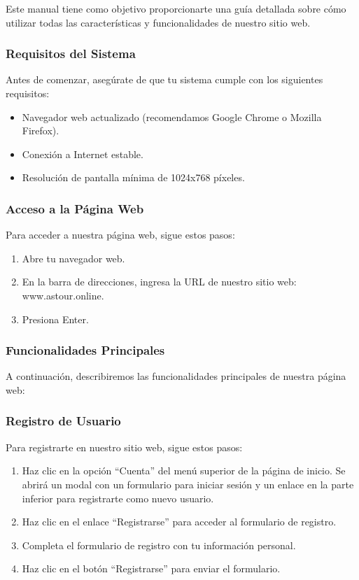 Este manual tiene como objetivo proporcionarte una guía detallada sobre cómo utilizar todas las características y funcionalidades de nuestro sitio web.

\subsubsection{Requisitos del Sistema}
Antes de comenzar, asegúrate de que tu sistema cumple con los siguientes requisitos:

\begin{itemize}
	\item Navegador web actualizado (recomendamos Google Chrome o Mozilla Firefox).
	\item Conexión a Internet estable.
	\item Resolución de pantalla mínima de 1024x768 píxeles.
\end{itemize}

\subsubsection{Acceso a la Página Web}
Para acceder a nuestra página web, sigue estos pasos:

\begin{enumerate}
	\item Abre tu navegador web.
	\item En la barra de direcciones, ingresa la URL de nuestro sitio web: www.astour.online.
	\item Presiona Enter.
\end{enumerate}

\subsubsection{Funcionalidades Principales}
A continuación, describiremos las funcionalidades principales de nuestra página web:

\subsubsection{Registro de Usuario}
Para registrarte en nuestro sitio web, sigue estos pasos:

\begin{enumerate}
	\item Haz clic en la opción “Cuenta” del menú superior de la página de inicio. Se abrirá un modal con un formulario para iniciar sesión y un enlace en la parte inferior para registrarte como nuevo usuario.
	\item Haz clic en el enlace “Registrarse” para acceder al formulario de registro.
	\item Completa el formulario de registro con tu información personal.
	\item Haz clic en el botón “Registrarse” para enviar el formulario.
\end{enumerate}

